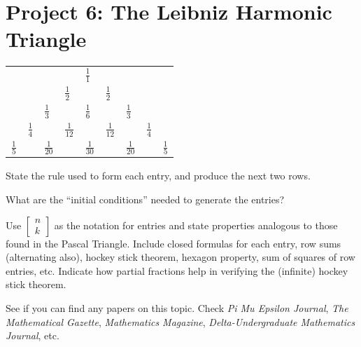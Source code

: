 \documentclass[10pt,]{book}
\theoremstyle{plain}
\theoremstyle{definition}
\theoremstyle{definition}
\theoremstyle{definition}
\numberwithin{equation}{chapter}
\begin{document}
\section[{Project 6: The Leibniz Harmonic Triangle}]{Project 6: The Leibniz Harmonic Triangle}\label{exercises-10}
\begin{sidebyside}{1}{0}{0}{0}
\begin{sbspanel}{1}
{\centering%
\begin{tabular}{lllllllll}
&&&&\(\frac{1}{1}\)&&&&\tabularnewline[0pt]
&&&\(\frac{1}{2}\)&&\(\frac{1}{2}\)&&&\tabularnewline[0pt]
&&\(\frac{1}{3}\)&&\(\frac{1}{6}\)&&\(\frac{1}{3}\)&&\tabularnewline[0pt]
&\(\frac{1}{4}\)&&\(\frac{1}{12}\)&&\(\frac{1}{12}\)&&\(\frac{1}{4}\)&\tabularnewline[0pt]
\(\frac{1}{5}\)&&\(\frac{1}{20}\)&&\(\frac{1}{30}\)&&\(\frac{1}{20}\)&&\(\frac{1}{5}\)
\end{tabular}
\par}
\end{sbspanel}
\end{sidebyside}
\begin{divisionexercise}{1}\hypertarget{exercise-98}{}
\hypertarget{p-1459}{}%
State the rule used to form each entry, and produce the next two rows.%
\end{divisionexercise}%
\begin{divisionexercise}{2}\hypertarget{exercise-99}{}
\hypertarget{p-1460}{}%
What are the ``initial conditions'' needed to generate the entries?%
\end{divisionexercise}%
\begin{divisionexercise}{3}\hypertarget{exercise-100}{}
\hypertarget{p-1461}{}%
Use \(\begin{bmatrix} n\\ k \end{bmatrix}\) as the notation for entries and state properties analogous to those found in the Pascal Triangle. Include closed formulas for each entry, row sums (alternating also), hockey stick theorem, hexagon property, sum of squares of row entries, etc. Indicate how partial fractions help in verifying the (infinite) hockey stick theorem.%
\end{divisionexercise}%
\begin{divisionexercise}{4}\hypertarget{exercise-101}{}
\hypertarget{p-1462}{}%
See if you can find any papers on this topic. Check \emph{Pi Mu Epsilon Journal}, \emph{The Mathematical Gazette}, \emph{Mathematics Magazine}, \emph{Delta-Undergraduate Mathematics Journal}, etc.%
\end{divisionexercise}%
\typeout{************************************************}
\typeout{************************************************}
\end{document}

